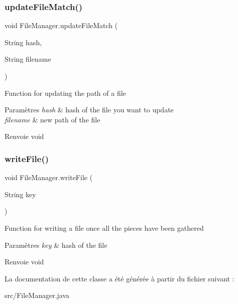 \subsubsection{\texorpdfstring{update\+File\+Match()}{updateFileMatch()}}
{\footnotesize\ttfamily void File\+Manager.\+update\+File\+Match (\begin{DoxyParamCaption}\item[{String}]{hash,  }\item[{String}]{filename }\end{DoxyParamCaption})\hspace{0.3cm}{\ttfamily [inline]}}

Function for updating the path of a file


\begin{DoxyParams}{Paramètres}
{\em hash} & hash of the file you want to update \\
\hline
{\em filename} & new path of the file \\
\hline
\end{DoxyParams}
\begin{DoxyReturn}{Renvoie}
void 
\end{DoxyReturn}
\mbox{\label{classFileManager_a0715bc52c509e1f0c5011dd1d7a9b76f}} 
\subsubsection{\texorpdfstring{write\+File()}{writeFile()}}
{\footnotesize\ttfamily void File\+Manager.\+write\+File (\begin{DoxyParamCaption}\item[{String}]{key }\end{DoxyParamCaption})\hspace{0.3cm}{\ttfamily [inline]}}

Function for writing a file once all the pieces have been gathered


\begin{DoxyParams}{Paramètres}
{\em key} & hash of the file \\
\hline
\end{DoxyParams}
\begin{DoxyReturn}{Renvoie}
void 
\end{DoxyReturn}


La documentation de cette classe a été générée à partir du fichier suivant \+:\begin{DoxyCompactItemize}
\item 
src/File\+Manager.\+java\end{DoxyCompactItemize}
